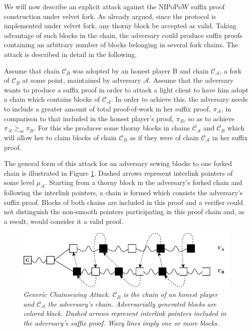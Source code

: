 We  will now describe an explicit attack against the NIPoPoW suffix proof construction under velvet fork. As already argued, since the protocol is implemented under velvet fork, any thorny block be accepted as valid. Taking advantage 
of such blocks in the chain, the adversary could produce suffix proofs containing an arbitrary number of blocks belonging in several fork chains.
The attack is described in detail in the following.

Assume that chain $\mathcal{C}_B$ was adopted by an honest player B and chain $\mathcal{C}_\mathcal{A}$, 
a fork of $\mathcal{C}_B$ at some point, maintained by adversary $\mathcal{A}$. Assume that the
adversary wants to produce a suffix  proof in order to attack a light client 
to have him adopt a chain which contains blocks of $\mathcal{C}_\mathcal{A}$. In order to achieve
this, the adversary needs to include a greater amount of total proof-of-work
in her suffix proof, $\pi_\mathcal{A}$, in comparison to that included in the honest
player's proof, $\pi_B$, so as to achieve $\pi_\mathcal{A} \geq_m \pi_B$. For this she
produces some thorny blocks in chains $\mathcal{C}_\mathcal{A}$ and $\mathcal{C}_B$ which will allow her to
claim blocks of chain $\mathcal{C}_B$ as if they were of chain $\mathcal{C}_\mathcal{A}$ in her suffix proof.

The general form of this attack for an adversary sewing blocks to one forked
chain is illustrated in Figure \ref{fig:generic_attack}. 
Dashed arrows
represent interlink pointers of some level $\mu_\mathcal{A}$. Starting from a thorny
block in the adversary's forked chain and following the interlink pointers,
a chain is formed which consists the adversary's suffix proof. Blocks of 
both chains are included in this proof and a verifier could not distinguish 
the non-smooth pointers participating in this proof chain and, as a result,
would consider it a valid proof.

\begin{figure}[h]
	\begin{center}
		\includegraphics[scale=0.63
		]{figures/generic_chainsewing_attack.pdf}
	\end{center}
	\caption{\textit{Generic Chainsewing Attack. $\mathcal{C}_B$ is the chain of an honest
	player and $\mathcal{C}_\mathcal{A}$ the adversary's chain. Adversarially generated blocks are
	colored black. Dashed arrows represent interlink pointers included in the 
	adversary's suffix proof. Wavy lines imply one or more blocks.}}
	\label{fig:generic_attack}
\end{figure}

